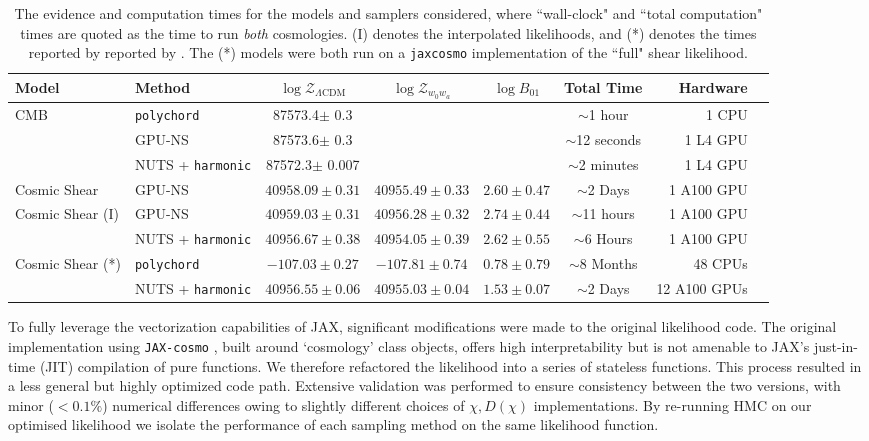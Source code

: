 \documentclass[twocolumn]{openjournal}
\begin{document}
\begin{table}[ht]
\caption{The evidence and computation times for the models and samplers considered, where ``wall-clock" and ``total computation" times are quoted as the time to run \textit{both} cosmologies. (I) denotes the interpolated likelihoods, and (*) denotes the times reported by reported by \cite{Piras_2024}. The (*) models were both run on a \texttt{jax\textunderscore cosmo} implementation of the ``full" shear likelihood.}
\label{tab:results} 
\vskip 0.15in
\begin{center}
\begin{small}
\begin{tabular}{llcc|c|crr}
\toprule
Model  & Method & $\log \mathcal{Z}_{\Lambda\text{CDM}}$ & $\log \mathcal{Z}_{w_0w_a}$ & $\log B_{01}$ & Total Time & Hardware \\ 
\midrule
CMB  &  \texttt{polychord} & 87573.4$\pm$ 0.3&  &&  $\sim$1 hour  & 1 CPU \\
  &  GPU-NS & 87573.6$\pm$ 0.3&  & & $\sim$12 seconds  & 1 L4 GPU \\
 &  NUTS + \texttt{harmonic} & 87572.3$\pm$ 0.007& & &  $\sim$2 minutes  & 1 L4 GPU \\
\midrule
Cosmic Shear &   GPU-NS &  $40958.09 \pm 0.31$ & $40955.49 \pm 0.33$ &$ 2.60 \pm 0.47$& $\sim$2 Days  & 1 A100 GPU &  \\
\midrule
Cosmic Shear (I)  & GPU-NS &  $40959.03 \pm 0.31$ & $40956.28 \pm 0.32$ & $2.74 \pm 0.44$ & $\sim$11 hours  & 1 A100 GPU &  \\
 &  NUTS + \texttt{harmonic} & $40956.67\pm  0.38$ &  $40954.05 \pm 0.39 $& $2.62 \pm 0.55 $ & $\sim$6 Hours & 1 A100 GPU  \\ \midrule
Cosmic Shear (*)   &  \texttt{polychord} & $-107.03\pm 0.27$& $-107.81 \pm 0.74$& $0.78 \pm 0.79$& $\sim$8 Months  & 48 CPUs \\
   &  NUTS + \texttt{harmonic} & $40956.55 \pm 0.06$& $40955.03 \pm 0.04$ & $1.53 \pm 0.07$ & $\sim$2 Days &12 A100 GPUs \\ 

\bottomrule
\end{tabular}
\end{small}
\end{center}
\vskip -0.1in
\end{table}

To fully leverage the vectorization capabilities of JAX, significant modifications were made to the original likelihood code. The original implementation using \texttt{JAX-cosmo} \citep{jaxcosmo}, built around `cosmology' class objects, offers high interpretability but is not amenable to JAX's just-in-time (JIT) compilation of pure functions. We therefore refactored the likelihood into a series of stateless functions. This process resulted in a less general but highly optimized code path. Extensive validation was performed to ensure consistency between the two versions, with minor ($< 0.1\%$) numerical differences owing to slightly different choices of $\chi, D(\chi)$ implementations. By re-running HMC on our optimised likelihood we isolate the performance of each sampling method on the same likelihood function.
\end{document}
